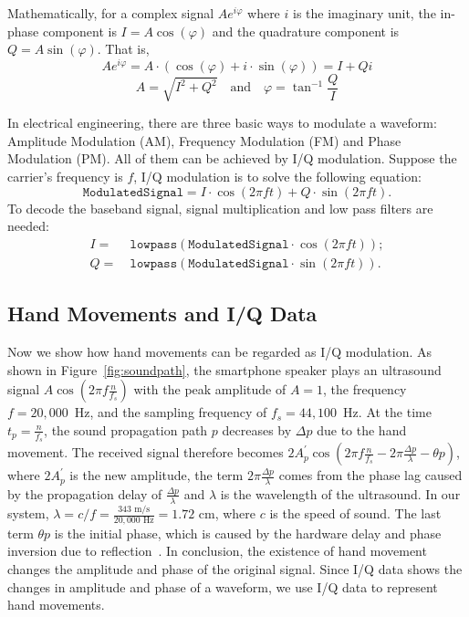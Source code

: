 Mathematically, for a complex signal $Ae^{i \varphi }$ where $i$ is the imaginary unit, the in-phase component is $I = A\cos(\varphi)$ and the quadrature component is $Q = A\sin(\varphi)$. That is,
\begin{displaymath}
	Ae^{i \varphi } = A \cdot (\cos(\varphi) + i \cdot \sin(\varphi)) = I + Qi
\end{displaymath}
\begin{displaymath}
 A = \sqrt{I^2 + Q^2}  \quad \text{and} \quad \varphi = \tan^{-1}\frac{Q}{I}
\end{displaymath}


In electrical engineering, there are three basic ways to modulate a waveform: Amplitude Modulation (AM), Frequency Modulation (FM) and Phase Modulation (PM). All of them can be achieved by I/Q modulation. Suppose the carrier's frequency is $f$, I/Q modulation is to solve the following equation:
\begin{displaymath}
\texttt{ModulatedSignal} = I \cdot \cos(2 \pi f t) + Q \cdot \sin(2 \pi f t) .
\end{displaymath}
To decode the baseband signal, signal multiplication and low pass filters are needed:
\begin{align*}
I =~&\texttt{lowpass} (\texttt{ModulatedSignal}  \cdot  \cos(2 \pi f t) ) ;\\        
Q=~&\texttt{lowpass} (\texttt{ModulatedSignal}  \cdot \sin(2 \pi f t) ) .
\end{align*}

\subsection{Hand Movements and I/Q Data}
Now we show how hand movements can be regarded as I/Q modulation. As shown in Figure~\ref{fig:soundpath}, the smartphone speaker plays an ultrasound signal $A\cos \left (2\pi f \frac{n}{f_s}\right)$ with the peak amplitude of $A=1$, the frequency $f = 20,000 $~Hz, and the sampling frequency of $f_s = 44,100 $~Hz. At the time $t_p = \frac{n}{f_s}$, the sound propagation path $p$ decreases by $\Delta p$ due to the hand movement. The received signal therefore becomes $2A^\prime_p \cos \left (2\pi f \frac{n}{f_s}  - 2 \pi \frac{\Delta p}{\lambda} - \theta p\right)$, where $2A^\prime_p$ is the new amplitude, the term $2 \pi \frac{\Delta p}{\lambda}$ comes from the phase lag caused by the propagation delay of $\frac{\Delta p}{\lambda}$ and $\lambda$ is the wavelength of the ultrasound. In our system, $\lambda = c/f = \frac{343 \text{~m/s}}{20,000 \text{~Hz}} = 1.72 \text{~cm}$, where $c$ is the speed of sound. The last term $ \theta p$ is the  initial phase, which is caused by the hardware delay and phase inversion due to reflection~\cite{wang2016device}.  
In conclusion, the existence of hand movement changes the amplitude and phase of the original signal. Since I/Q data shows the changes in amplitude and phase of a waveform, we use I/Q data to represent hand movements.

